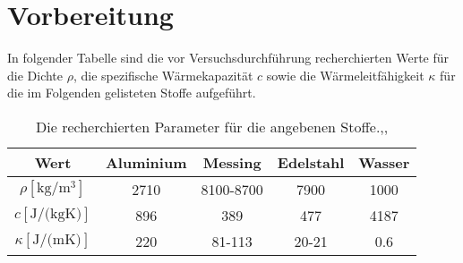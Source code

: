 \section{Vorbereitung}
\label{sec:vorbereitung}
In folgender Tabelle sind die vor Versuchsdurchführung recherchierten Werte für
die Dichte $\rho$, die spezifische Wärmekapazität $c$ sowie die Wärmeleitfähigkeit $\kappa$
für die im Folgenden gelisteten Stoffe aufgeführt.

\begin{table}[H]
  \centering
  \caption{Die recherchierten Parameter für die angebenen Stoffe.\cite{AP03},\cite{AP04},\cite{AP02}}
  \label{tab:vorbereitung}
  \begin{tabular}{S S S[table-format=8.0] S S}
    \toprule
    {Wert}  & {Aluminium} & {Messing} & {Edelstahl} & {Wasser} \\
    \midrule
    $\rho [\si{\kilo\gram\per\cubic\meter}]   $ & 2710     & {8100-8700}& 7900        & 1000  \\
    $c    [\si{\joule\per(\kilo\gram\kelvin)}]  $ & 896      & 389        & 477         & 4187  \\
    $\kappa [\si{\joule\per(\meter\kelvin)}]$ & 220      & {81-113}   & {20-21}     & 0.6   \\
    \bottomrule
  \end{tabular}
\end{table}
